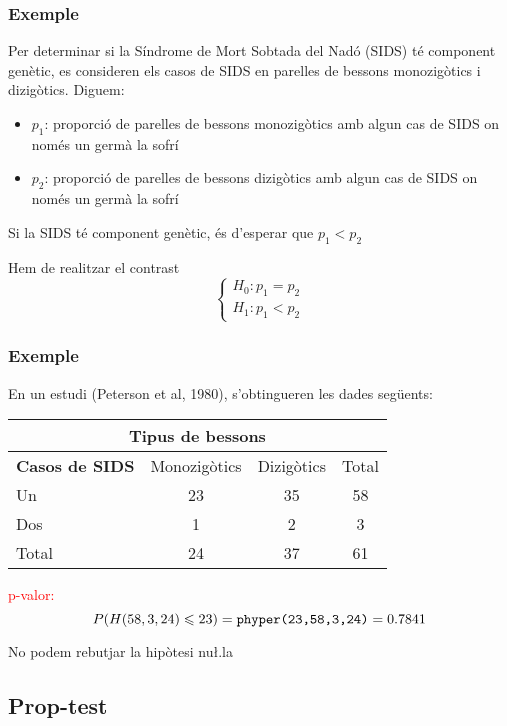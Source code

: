 \documentclass[12pt,t]{beamer}\usepackage[]{graphicx}\usepackage[]{color}
\newcommand{\red}[1]{\textcolor{red}{#1}}
\renewcommand{\leq}{\leqslant}
\theoremstyle{plain}
\theoremstyle{definition}
\begin{document}
\begin{frame}
\frametitle{Exemple}
\vspace*{-1ex}

Per determinar si la Síndrome de Mort Sobtada del Nadó (SIDS) té component genètic, es consideren els casos de SIDS en parelles de bessons monozigòtics i dizigòtics. Diguem: 
\begin{itemize}
\item $p_1$: proporció de parelles de bessons monozigòtics amb algun cas de SIDS on només un germà la sofrí

\item $p_2$: proporció de parelles de bessons dizigòtics amb algun cas de SIDS on només un germà la sofrí
\end{itemize}

Si la SIDS té component genètic, és d'esperar que $p_1<p_2$
\medskip

Hem de realitzar el contrast
$$
\left\{\begin{array}{l}
H_0:p_1=p_2\\
H_1:p_1< p_2
\end{array}\right.
$$
\end{frame}

\begin{frame}
\frametitle{Exemple}

En un estudi (Peterson et al, 1980), s'obtingueren les dades següents:
\begin{center}
\begin{tabular}{l|cc|c|}
\multicolumn{4}{c}{\textbf{\hphantom{ \textbf{Casos de }} Tipus de bessons}} \\ \hline
 \textbf{Casos de SIDS} & Monozigòtics & Dizigòtics & Total \\
 Un  & 23 & 35 & 58\\
 Dos & 1 & 2 & 3\\\hline
Total  & 24 & 37 & 61
\\\hline
\end{tabular}
\end{center}

\red{p-valor:}
$$
P(H(58,3,24)\leq 23) =\mbox{\texttt{phyper(23,58,3,24)}}=0.7841
$$

No podem rebutjar la hipòtesi nu\l.la

\end{frame}





\subsection{Prop-test}
\end{document}
